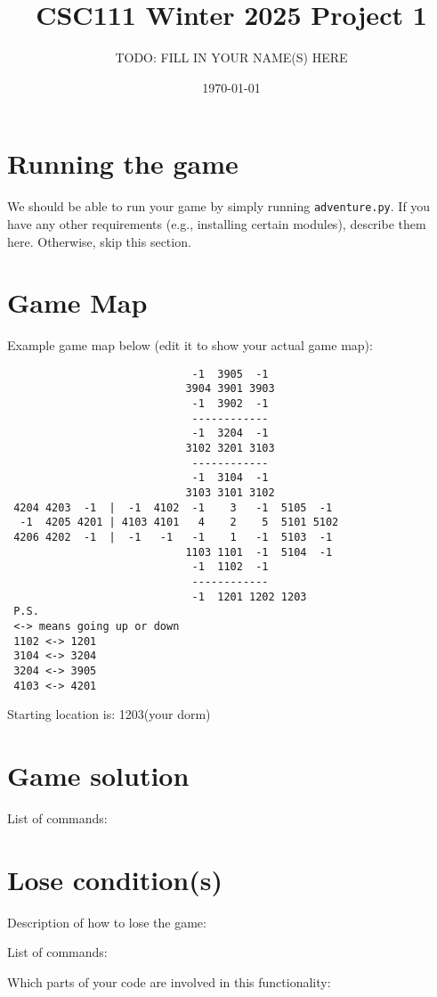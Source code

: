 \documentclass[11pt]{article}
\title{CSC111 Winter 2025 Project 1}
\author{TODO: FILL IN YOUR NAME(S) HERE}
\date{\today}
\begin{document}
\maketitle

\section*{Running the game}
We should be able to run your game by simply running \texttt{adventure.py}. If you have any other requirements (e.g., installing certain modules), describe them here. Otherwise, skip this section.

\section*{Game Map}
Example game map below (edit it to show your actual game map):

\begin{verbatim}
                             -1  3905  -1
                            3904 3901 3903
                             -1  3902  -1
                             ------------
                             -1  3204  -1
                            3102 3201 3103
                             ------------
                             -1  3104  -1
                            3103 3101 3102
 4204 4203  -1  |  -1  4102  -1    3   -1  5105  -1
  -1  4205 4201 | 4103 4101   4    2    5  5101 5102
 4206 4202  -1  |  -1   -1   -1    1   -1  5103  -1
                            1103 1101  -1  5104  -1
                             -1  1102  -1
                             ------------
                             -1  1201 1202 1203
 P.S.
 <-> means going up or down
 1102 <-> 1201
 3104 <-> 3204
 3204 <-> 3905
 4103 <-> 4201

\end{verbatim}

Starting location is: 1203(your dorm)

\section*{Game solution}
List of commands:

\section*{Lose condition(s)}
Description of how to lose the game:

List of commands:

Which parts of your code are involved in this functionality:
\end{document}
